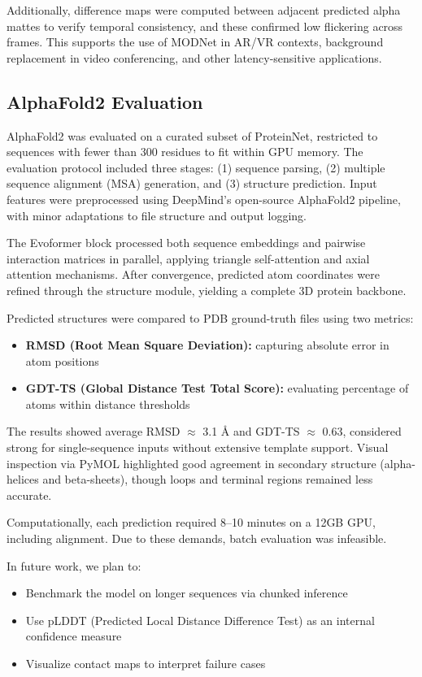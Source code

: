 \documentclass{article}
\begin{document}
Additionally, difference maps were computed between adjacent predicted alpha mattes to verify temporal consistency, and these confirmed low flickering across frames. This supports the use of MODNet in AR/VR contexts, background replacement in video conferencing, and other latency-sensitive applications.

\subsection{AlphaFold2 Evaluation}

AlphaFold2 was evaluated on a curated subset of ProteinNet, restricted to sequences with fewer than 300 residues to fit within GPU memory. The evaluation protocol included three stages: (1) sequence parsing, (2) multiple sequence alignment (MSA) generation, and (3) structure prediction. Input features were preprocessed using DeepMind's open-source AlphaFold2 pipeline, with minor adaptations to file structure and output logging.

The Evoformer block processed both sequence embeddings and pairwise interaction matrices in parallel, applying triangle self-attention and axial attention mechanisms. After convergence, predicted atom coordinates were refined through the structure module, yielding a complete 3D protein backbone.

Predicted structures were compared to PDB ground-truth files using two metrics:
\begin{itemize}
  \item \textbf{RMSD (Root Mean Square Deviation):} capturing absolute error in atom positions
  \item \textbf{GDT-TS (Global Distance Test Total Score):} evaluating percentage of atoms within distance thresholds
\end{itemize}

The results showed average RMSD $\approx$ 3.1 \AA{} and GDT-TS $\approx$ 0.63, considered strong for single-sequence inputs without extensive template support. Visual inspection via PyMOL highlighted good agreement in secondary structure (alpha-helices and beta-sheets), though loops and terminal regions remained less accurate.

Computationally, each prediction required 8--10 minutes on a 12GB GPU, including alignment. Due to these demands, batch evaluation was infeasible.

In future work, we plan to:
\begin{itemize}
  \item Benchmark the model on longer sequences via chunked inference
  \item Use pLDDT (Predicted Local Distance Difference Test) as an internal confidence measure
  \item Visualize contact maps to interpret failure cases
\end{itemize}
\end{document}
